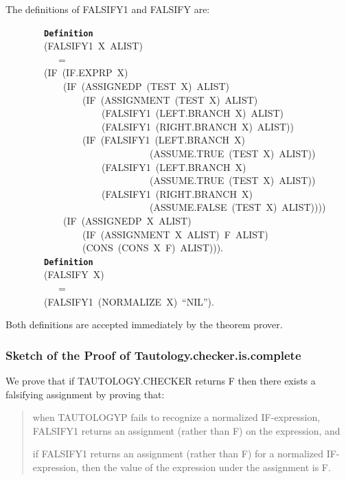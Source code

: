 \documentclass[11pt]{book}
\newenvironment{pubasis}{\begin{flushleft}\ttfamily\small}{\normalsize\rmfamily\end{flushleft}}
\newenvironment{pubcrown}{\begin{quote}}{\end{quote}}
\newcommand{\axiomordefinition}[1]{\vspace{6pt}\texttt{\textbf{#1}}}
\newcommand{\pubdefaulttextsize}{\large}
\begin{document}
The definitions of FALSIFY1 and FALSIFY are:
\begin{pubasis}
~~~~~~~~\axiomordefinition{Definition}\\
~~~~~~~~(FALSIFY1~X~ALIST)\\
~~~~~~~~~~~=\\
~~~~~~~~(IF~(IF.EXPRP~X)\\
~~~~~~~~~~~~(IF~(ASSIGNEDP~(TEST~X)~ALIST)\\
~~~~~~~~~~~~~~~~(IF~(ASSIGNMENT~(TEST~X)~ALIST)\\
~~~~~~~~~~~~~~~~~~~~(FAL\-SI\-FY1~(LEFT.BRANCH~X)~ALIST)\\
~~~~~~~~~~~~~~~~~~~~(FAL\-SI\-FY1~(RIGHT.BRANCH~X)~ALIST))\\
~~~~~~~~~~~~~~~~(IF~(FAL\-SI\-FY1~(LEFT.BRANCH~X)\\
~~~~~~~~~~~~~~~~~~~~~~~~~~~~~~(AS\-SUME.TRUE~(TEST~X)~ALIST))\\
~~~~~~~~~~~~~~~~~~~~(FAL\-SI\-FY1~(LEFT.BRANCH~X)\\
~~~~~~~~~~~~~~~~~~~~~~~~~~~~~~(AS\-SUME.TRUE~(TEST~X)~ALIST))\\
~~~~~~~~~~~~~~~~~~~~(FAL\-SI\-FY1~(RIGHT.BRANCH~X)\\
~~~~~~~~~~~~~~~~~~~~~~~~~~~~~~(AS\-SUME.FALSE~(TEST~X)~ALIST))))\\
~~~~~~~~~~~~(IF~(ASSIGNEDP~X~ALIST)\\
~~~~~~~~~~~~~~~~(IF~(ASSIGNMENT~X~ALIST)~F~ALIST)\\
~~~~~~~~~~~~~~~~(CONS~(CONS~X~F)~ALIST))).\\

~~~~~~~~\axiomordefinition{Definition}\\
~~~~~~~~(FALSIFY~X)\\
~~~~~~~~~~~=\\
~~~~~~~~(FALSIFY1~(NORMALIZE~X)~``NIL'').\\
\end{pubasis}
Both definitions are accepted immediately by the theorem prover.
\subsubsection{Sketch of the Proof of Tautology.checker.is.complete}
\pubdefaulttextsize
We prove that  if TAU\-TOL\-OGY.CHECK\-ER returns F then there exists
a falsifying assignment by proving that:
\begin{pubcrown}
when TAUTOLOGYP fails to recognize a normalized IF-expression,
FALSIFY1 returns an assignment (rather than F) on the expression, and

if FALSIFY1 returns an assignment (rather than F) for a normalized IF-expression,
then the value of the expression under the assignment is F.
\end{pubcrown}
\end{document}
